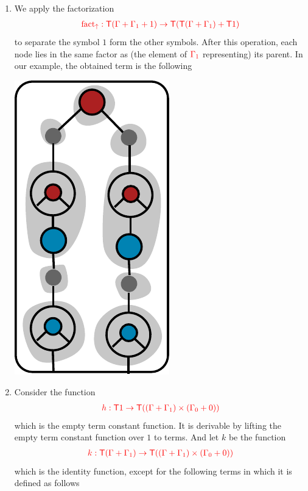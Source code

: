 \begin{example}
\begin{enumerate}
\begin{center}
		\end{center}
\item We apply the factorization 
\begin{align*}
{\color{red}{{\color{red}{\mathrm{fact_{\uparrow}}}}: {\color{red}{\mathsf T}}(\Gamma+\Gamma_1+1) \to {\color{red}{\mathsf T}}({\color{red}{\mathsf T}}(\Gamma+\Gamma_1)+{\color{red}{\mathsf T}}1)}}
\end{align*}
 to separate the symbol $1$ form the other symbols. After this operation, each node lies in the same factor as (the element of $\ranked{\Gamma_1}$ representing) its parent. In our example, the obtained term is the following
\begin{center}
		\includegraphics[scale=.5]{pictures/parent-block.pdf}
		\end{center}
\item Consider the function 
\begin{align*}
{\color{red}{h: {\color{red}{\mathsf T}}1 \to {\color{red}{\mathsf T}}((\Gamma+\Gamma_1)\times(\Gamma_0+0))}}
\end{align*}
which is the empty term constant function. It is derivable by lifting the empty term constant function over $1$ to terms.
And let $k$ be the function
\begin{align*}
{\color{red}{k: {\color{red}{\mathsf T}}(\Gamma+\Gamma_1) \to {\color{red}{\mathsf T}}((\Gamma+\Gamma_1)\times(\Gamma_0+0))}}
\end{align*}
which is the identity function, except for the following terms in which it is defined as follows
$$\begin{array}{rll}

\end{array}$$
\end{enumerate}
\end{example}
